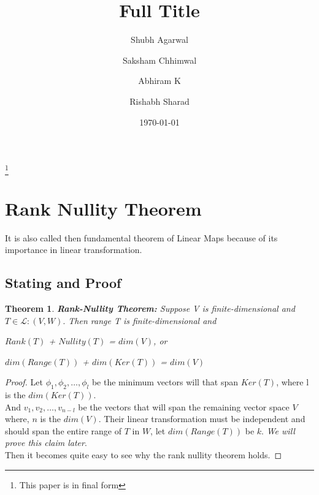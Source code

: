 \documentclass[a4paper,12pt,reqno,oneside]{amsart}
\newtheorem{theorem}{Theorem}
\theoremstyle{plain}
\numberwithin{equation}{section}
\begin{document}
\title[Short Title (for the running head)]{Full Title}

\author{Shubh Agarwal}
%

\author{Saksham Chhimwal}
%

\author{Abhiram K}
%

\author{Rishabh Sharad}
%

\thanks{This paper is in final form}
\date{\today}
\maketitle

\section{Rank Nullity Theorem}
It is also called then fundamental theorem of Linear Maps because of its importance
in linear transformation.

\subsection{Stating and Proof}

\begin{theorem}
	\textbf{Rank-Nullity Theorem:}
	Suppose V is finite-dimensional and $T\in\mathcal{L}:(V, W).$ Then range T is 
	finite-dimensional and 
	\begin{center}
		$Rank(T)$ + $Nullity(T)$ = $dim(V)$, or
	\end{center}
	\begin{center}
		$dim(Range(T))$ + $dim(Ker(T))$ = $dim(V)$
	\end{center}
\end{theorem}

\begin{proof}[Proof]
	Let $\phi_1,\phi_2,\ldots,\phi_l$ be the minimum vectors will that span $Ker(T)$, where l is the $dim(Ker(T))$.\\
	And $v_1, v_2, \ldots, v_{n-l}$ be the vectors that will span the remaining vector space
	$V$where, $n$ is the $dim(V)$.
	Their linear transformation must be independent and should span the entire range of $T$ in $W$, let $dim(Range(T))$
	be $k$.
	\emph{We will prove this claim later}.\\
	Then it becomes quite easy to see why the rank nullity theorem holds.
\end{proof}
\end{document}

